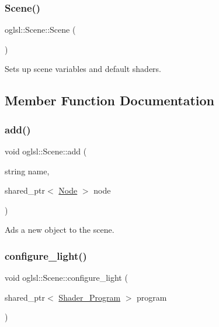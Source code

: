 \subsubsection{\texorpdfstring{Scene()}{Scene()}}
{\footnotesize\ttfamily oglsl\+::\+Scene\+::\+Scene (\begin{DoxyParamCaption}{ }\end{DoxyParamCaption})}



Sets up scene variables and default shaders. 



\subsection{Member Function Documentation}
\mbox{\label{classoglsl_1_1_scene_a1b1296aab1c81101473a38451c139819}} 
\subsubsection{\texorpdfstring{add()}{add()}}
{\footnotesize\ttfamily void oglsl\+::\+Scene\+::add (\begin{DoxyParamCaption}\item[{string}]{name,  }\item[{shared\+\_\+ptr$<$ \mbox{\hyperlink{classoglsl_1_1_node}{Node}} $>$}]{node }\end{DoxyParamCaption})\hspace{0.3cm}{\ttfamily [inline]}}



Ads a new object to the scene. 

\mbox{\label{classoglsl_1_1_scene_a91c975ee306374f17b9f348801f2ce3e}} 
\subsubsection{\texorpdfstring{configure\+\_\+light()}{configure\_light()}}
{\footnotesize\ttfamily void oglsl\+::\+Scene\+::configure\+\_\+light (\begin{DoxyParamCaption}\item[{shared\+\_\+ptr$<$ \mbox{\hyperlink{classoglsl_1_1_shader___program}{Shader\+\_\+\+Program}} $>$}]{program }\end{DoxyParamCaption})\hspace{0.3cm}{\ttfamily [virtual]}}



